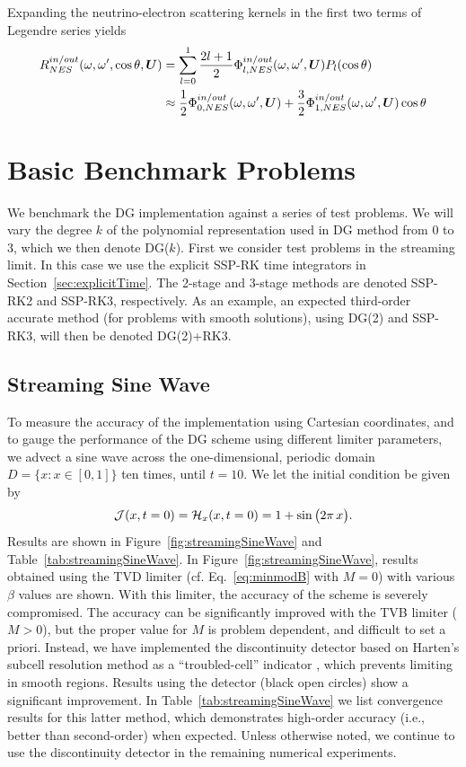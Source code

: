 \documentclass[10pt,preprint]{aastex}
\begin{document}
Expanding the neutrino-electron scattering kernels in the first two terms of Legendre series yields
\begin{align}
R^{in/out}_{NES}(\omega, \omega^{\prime}, \cos\theta, \boldsymbol{U}) & = \sum_{l=0}^{1} \dfrac{ 2l+1}{2}\Phi^{in/out}_{l,NES}(\omega,\omega^{\prime},\boldsymbol{U})P_l(\cos\theta) \\
& \approx \dfrac{1}{2}\Phi_{0,NES}^{in/out}(\omega,\omega^{\prime}, \boldsymbol{U}) + \dfrac{3}{2}\Phi^{in/out}_{1,NES}(\omega,\omega^{\prime}, \boldsymbol{U})\cos\theta
\end{align}

\section{Basic Benchmark Problems}

We benchmark the DG implementation against a series of test problems.  
We will vary the degree $k$ of the polynomial representation used in DG method from 0 to 3, which we then denote DG($k$).  
First we consider test problems in the streaming limit.  
In this case we use the explicit SSP-RK time integrators in Section~\ref{sec:explicitTime}.  
The 2-stage and 3-stage methods are denoted SSP-RK2 and SSP-RK3, respectively.  
As an example, an expected third-order accurate method (for problems with smooth solutions), using DG(2) and SSP-RK3, will then be denoted DG(2)+RK3.  

\subsection{Streaming Sine Wave}

To measure the accuracy of the implementation using Cartesian coordinates, and to gauge the performance of the DG scheme using different limiter parameters, we advect a sine wave across the one-dimensional, periodic domain $D=\{x:x\in[0,1]\}$ ten times, until $t=10$.  
We let the initial condition be given by
\begin{equation}
  \mathcal{J}(x,t=0)=\mathcal{H}_{x}(x,t=0)=1+\sin\big(2\pi\,x\big).  
\end{equation}
Results are shown in Figure~\ref{fig:streamingSineWave} and Table~\ref{tab:streamingSineWave}.  
In Figure~\ref{fig:streamingSineWave}, results obtained using the TVD limiter (cf. Eq.~\eqref{eq:minmodB} with $M=0$) with various $\beta$ values are shown.  
With this limiter, the accuracy of the scheme is severely compromised.  
The accuracy can be significantly improved with the TVB limiter ($M>0$), but the proper value for $M$ is problem dependent, and difficult to set a priori.  
Instead, we have implemented the discontinuity detector based on Harten's subcell resolution method as a ``troubled-cell'' indicator \citep{harten_1989,qiuShu_2005}, which prevents limiting in smooth regions.  
Results using the detector (black open circles) show a significant improvement.  
In Table~\ref{tab:streamingSineWave} we list convergence results for this latter method, which demonstrates high-order accuracy (i.e., better than second-order) when expected.  
Unless otherwise noted, we continue to use the discontinuity detector in the remaining numerical experiments.  
\end{document}

